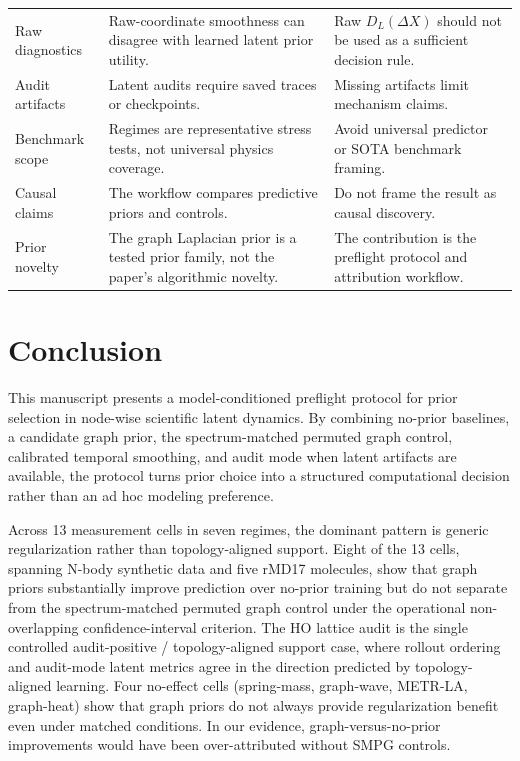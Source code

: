 \documentclass[preprint,12pt]{elsarticle}
\begin{document}
\begin{longtable}{>{\raggedright\arraybackslash}p{}>{\raggedright\arraybackslash}p{}>{\raggedright\arraybackslash}p{}}
Raw diagnostics & Raw-coordinate smoothness can disagree with learned latent prior utility. & Raw $D_L(\Delta X)$ should not be used as a sufficient decision rule. \\
Audit artifacts & Latent audits require saved traces or checkpoints. & Missing artifacts limit mechanism claims. \\
Benchmark scope & Regimes are representative stress tests, not universal physics coverage. & Avoid universal predictor or SOTA benchmark framing. \\
Causal claims & The workflow compares predictive priors and controls. & Do not frame the result as causal discovery. \\
Prior novelty & The graph Laplacian prior is a tested prior family, not the paper's algorithmic novelty. & The contribution is the preflight protocol and attribution workflow. \\
\end{longtable}
\endgroup

\section{Conclusion}
\label{sec:conclusion}

This manuscript presents a model-conditioned preflight protocol for 
prior selection in node-wise scientific latent dynamics. By combining 
no-prior baselines, a candidate graph prior, the spectrum-matched 
permuted graph control, calibrated temporal smoothing, and audit 
mode when latent artifacts are available, the protocol turns prior 
choice into a structured computational decision rather than an ad 
hoc modeling preference.

Across 13 measurement cells in seven regimes, the dominant pattern 
is generic regularization rather than topology-aligned support. 
Eight of the 13 cells, spanning N-body synthetic data and five 
rMD17 molecules, show that graph priors substantially improve 
prediction over no-prior training but do not separate from the 
spectrum-matched permuted graph control under the operational 
non-overlapping confidence-interval criterion. The HO lattice 
audit is the single controlled audit-positive / topology-aligned 
support case, where rollout ordering and audit-mode latent metrics 
agree in the direction predicted by topology-aligned learning. Four 
no-effect cells (spring-mass, graph-wave, METR-LA, graph-heat) show 
that graph priors do not always provide regularization benefit even 
under matched conditions. In our evidence, graph-versus-no-prior 
improvements would have been over-attributed without SMPG controls.
\end{document}
